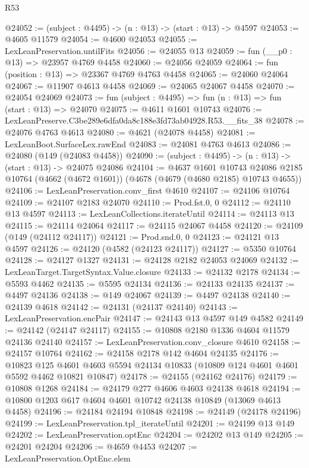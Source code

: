 \begin{lexlean}{R53}
\begin{coremodule}
@24052 := (subject : @4495) -> (n : @13) -> (start : @13) -> @4597
@24053 := @4605 @11579
@24054 := @4600 @24053
@24055 := LexLeanPreservation.untilFits
@24056 := @24055 @13
@24059 := fun (__p0 : @13) => @23957 @4769 @4458
@24060 := @24056 @24059
@24064 := fun (position : @13) => @23367 @4769 @4763 @4458
@24065 := @24060 @24064
@24067 := @11907 @4613 @4458
@24069 := @24065 @24067 @4458
@24070 := @24054 @24069
@24073 := fun (subject : @4495) => fun (n : @13) => fun (start : @13) => @24070
@24075 := @4611 @1601 @10743
@24076 := LexLeanPreserve.C3be289e6dfa0da8c188e3fd73ab04928.R53.__fits_38
@24078 := @24076 @4763 @4613
@24080 := @4621 (@24078 @4458)
@24081 := LexLeanBoot.SurfaceLex.rawEnd
@24083 := @24081 @4763 @4613
@24086 := @24080 (@149 (@24083 @4458))
@24090 := (subject : @4495) -> (n : @13) -> (start : @13) -> @24075 @24086
@24104 := @4637
    @1601
    @10743
    @24086
    @2185
    @10764
    (@4662 (@4672 @1601))
    (@4678 (@4679 (@4680 @2185) @10743 @4655))
@24106 := LexLeanPreservation.conv_first @4610
@24107 := @24106 @10764
@24109 := @24107 @2183 @24070
@24110 := Prod.fst.{0, 0}
@24112 := @24110 @13 @4597
@24113 := LexLeanCollections.iterateUntil
@24114 := @24113 @13
@24115 := @24114 @24064
@24117 := @24115 @24067 @4458
@24120 := @24109 (@149 (@24112 @24117))
@24121 := Prod.snd.{0, 0}
@24123 := @24121 @13 @4597
@24126 := @24120 (@4582 (@24123 @24117))
@24127 := @5350 @10764
@24128 := @24127 @1327
@24131 := @24128 @2182 @24053 @24069
@24132 := LexLeanTarget.TargetSyntax.Value.closure
@24133 := @24132 @2178
@24134 := @5593 @4462
@24135 := @5595 @24134
@24136 := @24133 @24135
@24137 := @4497 @24136
@24138 := @149 @24067
@24139 := @4497 @24138
@24140 := @24139 @4618
@24142 := @24131 (@24137 @24140)
@24143 := LexLeanPreservation.encPair
@24147 := @24143 @13 @4597 @149 @4582
@24149 := @24142 (@24147 @24117)
@24155 := @10808 @2180 @1336 @4604 @11579 @24136 @24140
@24157 := LexLeanPreservation.conv_closure @4610
@24158 := @24157 @10764
@24162 := @24158 @2178 @142 @4604 @24135
@24176 := @10823
    @125
    @4601
    @4603
    @5594
    @24134
    @10833
    (@10809 @124 @4601 @4601 @5592 @4462 @10821 @10847)
@24178 := @24155 (@24162 @24176)
@24179 := @10808 @1268
@24184 := @24179 @277 @4606 @4603 @24138 @4618
@24194 := @10800 @1203 @617 @4604 @4601 @10742 @24138 @10849 (@13069 @4613 @4458)
@24196 := @24184 @24194 @10848
@24198 := @24149 (@24178 @24196)
@24199 := LexLeanPreservation.tpl_iterateUntil
@24201 := @24199 @13 @149
@24202 := LexLeanPreservation.optEnc
@24204 := @24202 @13 @149
@24205 := @24201 @24204
@24206 := @4659 @4453
@24207 := LexLeanPreservation.OptEnc.elem

\end{coremodule}
\end{lexlean}
